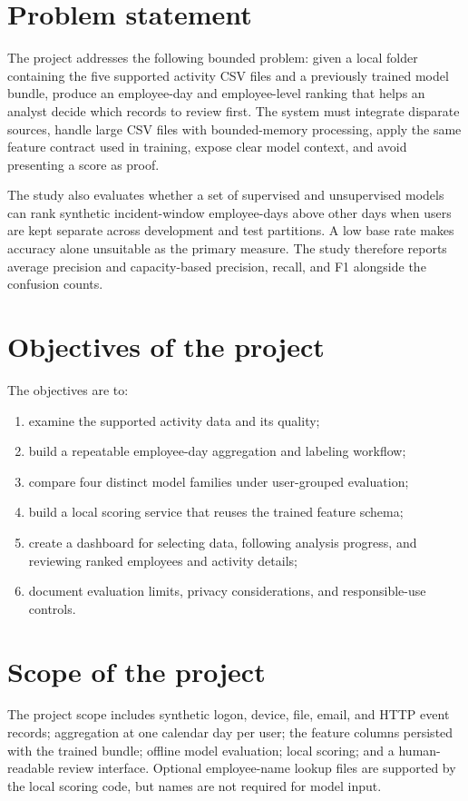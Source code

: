 \section{Problem statement}
The project addresses the following bounded problem: given a local
folder containing the five supported activity CSV files and a
previously trained model bundle, produce an employee-day and
employee-level ranking that helps an analyst decide which records to
review first. The system must integrate disparate sources, handle
large CSV files with bounded-memory processing, apply the same feature
contract used in training, expose clear model context, and avoid
presenting a score as proof.

The study also evaluates whether a set of supervised and unsupervised
models can rank synthetic incident-window employee-days above other
days when users are kept separate across development and test
partitions. A low base rate makes accuracy alone unsuitable as the
primary measure. The study therefore reports average precision and
capacity-based precision, recall, and F1 alongside the confusion
counts.

\section{Objectives of the project}
The objectives are to:
\begin{enumerate}
  \item examine the supported activity data and its quality;
  \item build a repeatable employee-day aggregation and labeling
  workflow;
  \item compare four distinct model families under user-grouped
  evaluation;
  \item build a local scoring service that reuses the trained feature
  schema;
  \item create a dashboard for selecting data, following analysis
  progress, and reviewing ranked employees and activity details;
  \item document evaluation limits, privacy considerations, and
  responsible-use controls.
\end{enumerate}

\section{Scope of the project}
The project scope includes synthetic logon, device, file, email, and
HTTP event records; aggregation at one calendar day per user; the
feature columns persisted with the trained bundle; offline model
evaluation; local scoring; and a human-readable review interface.
Optional employee-name lookup files are supported by the local scoring
code, but names are not required for model input.

